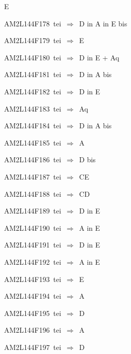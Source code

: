 {\tenit E}\par\smallskip
{\sixrm AM2L144F178\ {\sixit tei}\ }$\Rightarrow$\ {\tenit D} {\tenit in} {\tenit A}
{\tenit in} {\tenit E} {\tenit bis}\par\smallskip
{\sixrm AM2L144F179\ {\sixit tei}\ }$\Rightarrow$\ {\tenit E}\par\smallskip
{\sixrm AM2L144F180\ {\sixit tei}\ }$\Rightarrow$\ {\tenit D} {\tenit in} {\tenit E} +
{\tenit Aq}\par\smallskip
{\sixrm AM2L144F181\ {\sixit tei}\ }$\Rightarrow$\ {\tenit D} {\tenit in}
{\tenit A} {\tenit bis}\par\smallskip
{\sixrm AM2L144F182\ {\sixit tei}\ }$\Rightarrow$\ {\tenit D} {\tenit in}
{\tenit E}\par\smallskip
{\sixrm AM2L144F183\ {\sixit tei}\ }$\Rightarrow$\ {\tenit Aq}\par\smallskip
{\sixrm AM2L144F184\ {\sixit tei}\ }$\Rightarrow$\ {\tenit D} {\tenit in} {\tenit A} {\tenit bis}\par\smallskip
{\sixrm AM2L144F185\ {\sixit tei}\ }$\Rightarrow$\ {\tenit A}\par\smallskip
{\sixrm AM2L144F186\ {\sixit tei}\ }$\Rightarrow$\ {\tenit D} {\tenit bis}\par\smallskip
{\sixrm AM2L144F187\ {\sixit tei}\ }$\Rightarrow$\ CE\par\smallskip
{\sixrm AM2L144F188\ {\sixit tei}\ }$\Rightarrow$\ CD\par\smallskip
{\sixrm AM2L144F189\ {\sixit tei}\ }$\Rightarrow$\ {\tenit D} {\tenit in} {\tenit E}\par\smallskip
{\sixrm AM2L144F190\ {\sixit tei}\ }$\Rightarrow$\ {\tenit A} {\tenit in} {\tenit E}\par\smallskip
{\sixrm AM2L144F191\ {\sixit tei}\ }$\Rightarrow$\ {\tenit D} {\tenit in} {\tenit E}\par\smallskip
{\sixrm AM2L144F192\ {\sixit tei}\ }$\Rightarrow$\ {\tenit A} {\tenit in} {\tenit E}\par\smallskip
{\sixrm AM2L144F193\ {\sixit tei}\ }$\Rightarrow$\ {\tenit E}\par\smallskip
{\sixrm AM2L144F194\ {\sixit tei}\ }$\Rightarrow$\ {\tenit A}\par\smallskip
{\sixrm AM2L144F195\ {\sixit tei}\ }$\Rightarrow$\ D\par\smallskip
{\sixrm AM2L144F196\ {\sixit tei}\ }$\Rightarrow$\ {\tenit A}\par\smallskip
{\sixrm AM2L144F197\ {\sixit tei}\ }$\Rightarrow$\ {\tenit D}\par\smallskip

